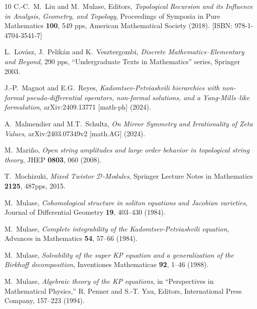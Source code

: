 \documentclass{amsart}
\theoremstyle{definition}
\numberwithin{equation}{section}
\numberwithin{figure}{section}
\newcommand{\cD}{{\mathcal{D}}}
\begin{document}
\begin{thebibliography}{10}
 C.-C.~M.~Liu and M.~Mulase, Editors,
 \emph{Topological Recursion and its Influence in Analysis, Geometry, and Topology}, 
 Proceedings of Symposia in Pure Mathematics \textbf{100}, 549 pps, American Mathematical Society
 (2018). [ISBN: 978-1-4704-3541-7]


 




L.~Lov\'asz, J.~Pelik\'an and K.~Vesztergombi,
\emph{Discrete Mathematics--Elementary and Beyond}, 290 pps, 
``Undergraduate Texts in Mathematics'' series,
Springer 2003.

J.-P.~Magnot and  E.G.~Reyes,
\emph{Kadomtsev-Petviashvili hierarchies with non-formal pseudo-differential operators, non-formal solutions, and a Yang-Mills--like formulation},
 	arXiv:2409.13771 [math-ph] (2024).
	
	
	
A.~Malmendier and M.T.~Schultz,
\emph{On Mirror Symmetry and Irrationality of Zeta Values},
 arXiv:2403.07349v2 [math.AG]  (2024).




  M.~Mari\~no,
  \emph{Open string amplitudes and large order behavior in topological string
  theory},
  JHEP {\bf 0803}, 060 (2008).





T.~Mochizuki,  
\emph{Mixed Twistor $\cD$-Modules}, 
Springer  Lecture Notes in Mathematics \textbf{2125},
487pps, 2015.



M.~Mulase,
\emph{Cohomological structure in soliton equations and Jacobian varieties}, Journal of Differential Geometry \textbf{19}, 403--430 (1984).

M.~Mulase,
\emph{Complete integrability of the Kadomtsev-Petviashvili equation}, Advances in Mathematics \textbf{54}, 57--66 (1984). 

M.~Mulase,
\emph{Solvability of the super KP equation and a generalization of the Birkhoff decomposition}, Inventiones Mathematicae \textbf{92}, 1--46 (1988).

M.~Mulase,
\emph{Algebraic theory of the KP equations}, in ``Perspectives in Mathematical Physics,'' R. Penner and S.-T. Yau, Editors, 
International Press Company, 157--223 (1994).




\end{thebibliography}
\end{document}
